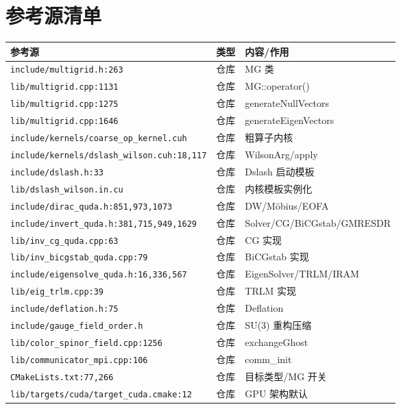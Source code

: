 \documentclass[UTF8]{ctexart}
\begin{document}
\section{参考源清单}
{\small
\begin{xltabular}{\textwidth}{XXX}
\toprule
\textcolor{evidence}{参考源} & 类型 & 内容/作用 \\
\midrule
\endhead
\texttt{\nolinkurl{include/multigrid.h:263}} & 仓库 & MG 类 \\
\texttt{\nolinkurl{lib/multigrid.cpp:1131}} & 仓库 & MG::operator() \\
\texttt{\nolinkurl{lib/multigrid.cpp:1275}} & 仓库 & generateNullVectors \\
\texttt{\nolinkurl{lib/multigrid.cpp:1646}} & 仓库 & generateEigenVectors \\
\texttt{\nolinkurl{include/kernels/coarse_op_kernel.cuh}} & 仓库 & 粗算子内核 \\
\texttt{\nolinkurl{include/kernels/dslash_wilson.cuh:18,117}} & 仓库 & WilsonArg/apply \\
\texttt{\nolinkurl{include/dslash.h:33}} & 仓库 & Dslash 启动模板 \\
\texttt{\nolinkurl{lib/dslash_wilson.in.cu}} & 仓库 & 内核模板实例化 \\
\texttt{\nolinkurl{include/dirac_quda.h:851,973,1073}} & 仓库 & DW/Möbius/EOFA \\
\texttt{\nolinkurl{include/invert_quda.h:381,715,949,1629}} & 仓库 & Solver/CG/BiCGstab/GMRESDR \\
\texttt{\nolinkurl{lib/inv_cg_quda.cpp:63}} & 仓库 & CG 实现 \\
\texttt{\nolinkurl{lib/inv_bicgstab_quda.cpp:79}} & 仓库 & BiCGstab 实现 \\
\texttt{\nolinkurl{include/eigensolve_quda.h:16,336,567}} & 仓库 & EigenSolver/TRLM/IRAM \\
\texttt{\nolinkurl{lib/eig_trlm.cpp:39}} & 仓库 & TRLM 实现 \\
\texttt{\nolinkurl{include/deflation.h:75}} & 仓库 & Deflation \\
\texttt{\nolinkurl{include/gauge_field_order.h}} & 仓库 & SU(3) 重构压缩 \\
\texttt{\nolinkurl{lib/color_spinor_field.cpp:1256}} & 仓库 & exchangeGhost \\
\texttt{\nolinkurl{lib/communicator_mpi.cpp:106}} & 仓库 & comm\_init \\
\texttt{\nolinkurl{CMakeLists.txt:77,266}} & 仓库 & 目标类型/MG 开关 \\
\texttt{\nolinkurl{lib/targets/cuda/target_cuda.cmake:12}} & 仓库 & GPU 架构默认 \\
\bottomrule
\end{xltabular}
}
\end{document}
